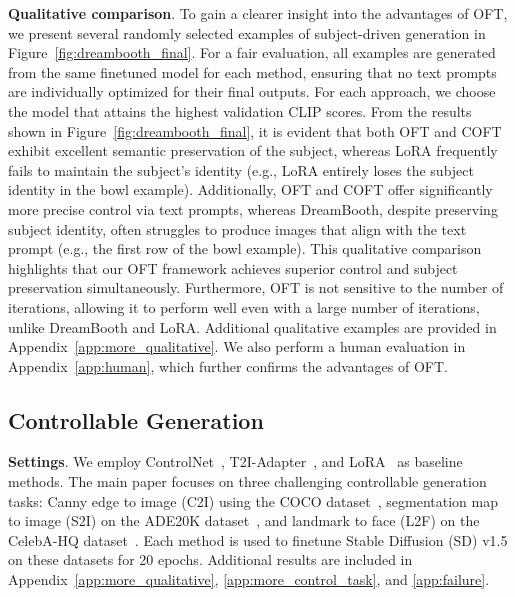 \textbf{Qualitative comparison}. To gain a clearer insight into the advantages of OFT, we present several randomly selected examples of subject-driven generation in Figure~\ref{fig:dreambooth_final}. For a fair evaluation, all examples are generated from the same finetuned model for each method, ensuring that no text prompts are individually optimized for their final outputs. For each approach, we choose the model that attains the highest validation CLIP scores. From the results shown in Figure~\ref{fig:dreambooth_final}, it is evident that both OFT and COFT exhibit excellent semantic preservation of the subject, whereas LoRA frequently fails to maintain the subject’s identity (e.g., LoRA entirely loses the subject identity in the bowl example). Additionally, OFT and COFT offer significantly more precise control via text prompts, whereas DreamBooth, despite preserving subject identity, often struggles to produce images that align with the text prompt (e.g., the first row of the bowl example). This qualitative comparison highlights that our OFT framework achieves superior control and subject preservation simultaneously. Furthermore, OFT is not sensitive to the number of iterations, allowing it to perform well even with a large number of iterations, unlike DreamBooth and LoRA. Additional qualitative examples are provided in Appendix~\ref{app:more_qualitative}. We also perform a human evaluation in Appendix~\ref{app:human}, which further confirms the advantages of OFT.

\subsection{Controllable Generation}

\textbf{Settings}. We employ ControlNet~\cite{zhang2023adding}, T2I-Adapter~\cite{mou2023t2i}, and LoRA~\cite{hulora2022} as baseline methods. The main paper focuses on three challenging controllable generation tasks: Canny edge to image (C2I) using the COCO dataset~\cite{lin2014microsoft}, segmentation map to image (S2I) on the ADE20K dataset~\cite{zhou2017scene}, and landmark to face (L2F) on the CelebA-HQ dataset~\cite{karras2018progressive,xia2021tedigan}. Each method is used to finetune Stable Diffusion (SD) v1.5 on these datasets for 20 epochs. Additional results are included in Appendix~\ref{app:more_qualitative}, \ref{app:more_control_task}, and \ref{app:failure}.

